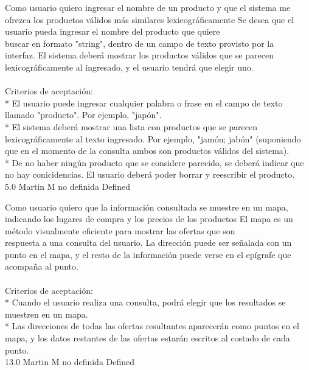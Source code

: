 	{Como usuario quiero ingresar el nombre de un producto y que el sistema me ofrezca los productos válidos más similares lexicográficamente} %
	{Se desea que el usuario pueda ingresar el nombre del producto que quiere\\
buscar en formato "string", dentro de un campo de texto provisto por la\\
interfaz. El sistema deberá mostrar los productos válidos que se parecen\\
lexicográficamente al ingresado, y el usuario tendrá que elegir uno.\\
  \\
Criterios de aceptación:\\
* El usuario puede ingresar cualquier palabra o frase en el campo de texto llamado "producto". Por ejemplo, "japón".  \\
* El sistema deberá mostrar una lista con productos que se parecen lexicográficamente al texto ingresado. Por ejemplo, "jamón; jabón" (suponiendo que en el momento de la consulta ambos son productos válidos del sistema).  \\
* De no haber ningún producto que se considere parecido, se deberá indicar que no hay conicidencias. El usuario deberá poder borrar y reescribir el producto.\\
} %
	{} %
	{5.0} %
	{Martin M} %
	{no definida} %
	{Defined} %


\vspace{20pt}

	{Como usuario quiero que la información consultada se muestre en un mapa, indicando los lugares de compra y los precios de los productos} %
	{El mapa es un método visualmente eficiente para mostrar las ofertas que son\\
respuesta a una consulta del usuario. La dirección puede ser señalada con un\\
punto en el mapa, y el resto de la información puede verse en el epígrafe que\\
acompaña al punto.\\
  \\
Criterios de aceptación:\\
* Cuando el usuario realiza una consulta, podrá elegir que los resultados se muestren en un mapa.  \\
* Las direcciones de todas las ofertas resultantes aparecerán como puntos en el mapa, y los datos restantes de las ofertas estarán escritos al costado de cada punto.\\
} %
	{} %
	{13.0} %
	{Martin M} %
	{no definida} %
	{Defined} %

